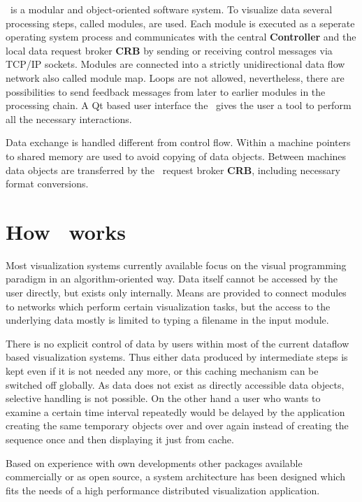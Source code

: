 \covise\ is a modular and object-oriented software system. To visualize data 
several processing steps, called modules, are used. Each module is executed as a 
seperate operating system process and communicates with the 
central {\bf Controller} and the local data request broker {\bf CRB} by sending or 
receiving control messages via TCP/IP sockets. 
Modules are connected into a strictly unidirectional data flow 
network also called module map. Loops are not
allowed, nevertheless, there are possibilities to send feedback messages from
later to earlier modules in the processing chain. A Qt based user interface 
the \mapeditor\ gives the user a tool to perform all the necessary interactions.

Data exchange is handled different from control flow. Within a machine
pointers to shared memory are used to avoid copying of data objects. Between
machines data objects are transferred by the \covise\ request broker 
{\bf CRB}, including necessary format conversions.  


\section{How \covise\ works}

Most visualization systems currently available focus on the visual programming 
paradigm in an algorithm-oriented way. Data itself cannot be accessed by the user 
directly, but exists only internally. Means are provided to connect modules to networks 
which perform certain visualization tasks, but the access to the underlying 
data mostly is limited to typing a filename in the input module. 

There is no explicit control of data by users within most of the current dataflow 
based visualization systems. Thus either data produced by intermediate steps is 
kept even if it is not needed any more, or this caching mechanism can be switched 
off globally. As data does not exist as directly accessible data objects, selective 
handling is not possible. On the other hand a user who wants to examine a certain 
time interval repeatedly would be delayed by the application creating the same 
temporary objects over and over again instead of creating the sequence once and 
then displaying it just from cache.

Based on experience with own developments 
other packages available commercially or as open source, a system architecture has been
designed which fits the needs of a high performance distributed visualization application. 


